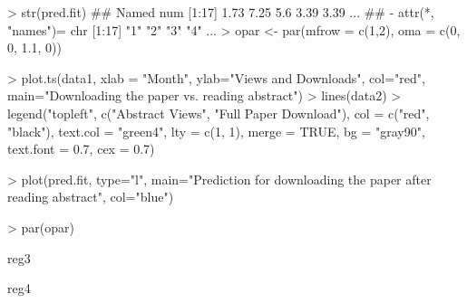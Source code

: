 > str(pred.fit)
##  Named num [1:17] 1.73 7.25 5.6 3.39 3.39 ...
##  - attr(*, "names")= chr [1:17] "1" "2" "3" "4" ...
> opar <- par(mfrow = c(1,2), oma = c(0, 0, 1.1, 0))

> plot.ts(data1, xlab = "Month", ylab="Views and Downloads", col="red", main="Downloading the paper vs. reading abstract")
> lines(data2)
> legend("topleft", c("Abstract Views", "Full Paper Download"), col = c("red", "black"), text.col = "green4", lty = c(1, 1), merge = TRUE, bg = "gray90", text.font = 0.7, cex = 0.7)

> plot(pred.fit, type="l", main="Prediction for downloading the paper after reading abstract", col="blue")

> par(opar)

reg3


reg4
